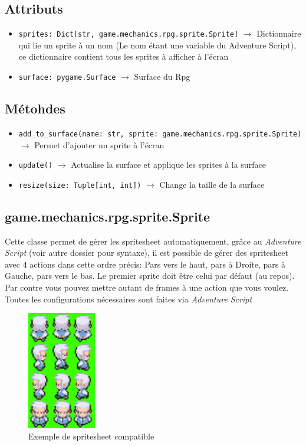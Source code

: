 \documentclass{report}
\begin{document}
\subsection*{Attributs}
\begin{itemize}
  \item \texttt{sprites: Dict[str, game.mechanics.rpg.sprite.Sprite]}	$\rightarrow$ Dictionnaire qui lie un sprite à un nom (Le nom étant une variable du Adventure Script), ce dictionnaire contient tous les sprites à afficher à l’écran
  \item \texttt{surface: pygame.Surface}	$\rightarrow$ Surface du Rpg
\end{itemize}

\subsection*{Métohdes}
\begin{itemize}
  \item \texttt{add_to_surface(name: str, sprite: game.mechanics.rpg.sprite.Sprite)}	$\rightarrow$ Permet d’ajouter un sprite à l’écran
  \item \texttt{update()}	$\rightarrow$  Actualise la surface et applique les sprites à la surface
  \item \texttt{resize(size: Tuple[int, int])}	$\rightarrow$ Change la taille de la surface
\end{itemize}
\newpage

\subsection {game.mechanics.rpg.sprite.Sprite}
Cette classe permet de gérer les spritesheet automatiquement, grâce au \emph{Adventure Script} (voir autre dossier pour syntaxe), il est possible de gérer des spritesheet avec 4 actions dans cette ordre précis: Pars vers le haut, pars à Droite, pars à Gauche,  pars vers le bas. Le premier sprite doit être celui par défaut (au repos). Par contre vous pouvez mettre autant de frames à une action que vous voulez. Toutes les configurations nécessaires sont faites via \emph{Adventure Script}

\begin{figure}[hb!]
  \centering
  \includegraphics[width=3cm]{img/image3}
  \caption{Exemple de spritesheet compatible}
  \label{fig:spritesheet}
\end{figure}
\end{document}
